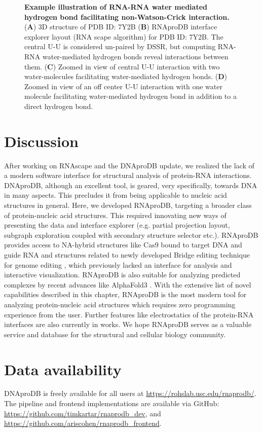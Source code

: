 \begin{center}
    \begin{figure}
        \caption[Example illustration of RNA-RNA water mediated hydrogen bond facilitating non-Watson-Crick interaction.]{\textbf{Example illustration of RNA-RNA water mediated hydrogen bond facilitating non-Watson-Crick interaction.} ({\bf A}) 3D structure of PDB ID: 7Y2B  ({\bf B}) RNAproDB interface explorer layout (RNA scape algorithm) for PDB ID: 7Y2B. The central U-U is considered un-paired by DSSR, but computing RNA-RNA water-mediated hydrogen bonds reveal interactions between them. ({\bf C}) Zoomed in view of central U-U interaction with two water-molecules facilitating water-mediated hydrogen bonds. ({\bf D}) Zoomed in view of an off center U-U interaction with one water molecule facilitating water-mediated hydrogen bond in addition to a direct hydrogen bond.}
  \label{fig:rnaprodb3}
\end{figure}
\end{center}

\section{Discussion}

After working on RNAscape \citep{Mitra2024rnascape} and the DNAproDB \citep{Sagendorf2017, Sagendorf2020} update, we realized the lack of a modern software interface for structural analysis of protein-RNA interactions. DNAproDB, although an excellent tool, is geared, very specifically, towards DNA in many aspects. This precludes it from being applicable to nucleic acid structures in general. Here, we developed RNAproDB, targeting a broader class of protein-nucleic acid structures. This required innovating new ways of presenting the data and interface explorer (e.g. partial projection layout, subgraph exploration coupled with secondary structure selector etc.). RNAproDB provides access to NA-hybrid structures like Cas9 bound to target DNA and guide RNA \citep{nishimasu2014crystal,} and structures related to newly developed Bridge editing technique for genome editing \citep{durrant2024bridge}, which previously lacked an interface for analysis and interactive visualization. RNAproDB is also suitable for analyzing predicted complexes by recent advances like AlphaFold3 \citep{Abramson2024}. With the extensive list of novel capabilities described in this chapter, RNAproDB is the most modern tool for analyzing protein-nucleic acid structures which requires zero programming experience from the user. Further features like electrostatics of the protein-RNA interfaces are also currently in works. We hope RNAproDB serves as a valuable service and database for the structural and cellular biology community.

\section{Data availability}
DNAproDB is freely available for all users at \url{https://rohslab.usc.edu/rnaprodb/}.
The pipeline and frontend implementations are available via GitHub:
\url{https://github.com/timkartar/rnaprodb_dev}, and
\url{https://github.com/ariscohen/rnaprodb_frontend}.